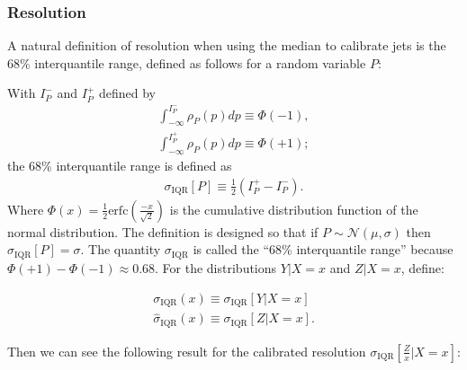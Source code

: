 \subsubsection{Resolution}
A natural definition of resolution when using the median to calibrate jets is the 68\% interquantile range, defined as follows for a random variable $P$:

\noindent With $I_P^-$ and $I_P^+$ defined by
\begin{align}
\int_{-\infty}^{I_P^-}\rho_P(p)dp \equiv \Phi(-1),\\
\int_{-\infty}^{I_P^+}\rho_P(p)dp \equiv \Phi(+1);
\end{align}
the 68\% interquantile range is defined as
\begin{align}
\sigma_\text{IQR}[P] \equiv \frac{1}{2}\left(I_P^+-I_P^-\right).
\end{align}
Where $\Phi(x)=\frac{1}{2}\text{erfc}\left(\frac{-x}{\sqrt{2}}\right)$ is the cumulative distribution function of the normal distribution. The definition is designed so that if $P\sim\mathcal{N}(\mu,\sigma)$ then $\sigma_\text{IQR}[P]=\sigma$. The quantity $\sigma_\text{IQR}$ is called the ``68\% interquantile range'' because $\Phi(+1)-\Phi(-1) \approx 0.68$.  For the distributions $Y|X=x$ and $Z|X=x$, define:

\begin{align}
\sigma_\text{IQR}(x) \equiv \sigma_\text{IQR}[Y|X=x]\\
\hat{\sigma}_\text{IQR}(x) \equiv \sigma_\text{IQR}[Z|X=x].
\end{align}

\noindent Then we can see the following result for the calibrated resolution $\sigma_\text{IQR}[\frac{Z}{x}|X=x]$:

\vspace{5mm}


\vspace{5mm}

